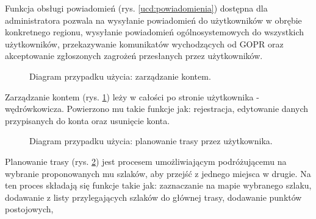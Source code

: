     Funkcja obsługi powiadomień (rys. \ref{ucd:powiadomienia}) dostępna dla administratora pozwala na wysyłanie powiadomień do użytkowników w obrębie konkretnego regionu, wysyłanie powiadomień ogólnosystemowych do wszystkich użytkowników, przekazywanie komunikatów wychodzących od GOPR oraz akceptowanie zgłoszonych zagrożeń przesłanych przez użytkowników.

    \setlength{\fboxrule}{0.5pt}
    \begin{figure}[H]
        \centering
        \caption{Diagram przypadku użycia: zarządzanie kontem.}
        \label{ucd:konto}
    \end{figure}
    Zarządzanie kontem (rys. \ref{ucd:konto}) leży w całości po stronie użytkownika - wędrówkowicza. Powierzono mu takie funkcje jak: rejestracja, edytowanie danych przypisanych do konta oraz usunięcie konta.

    \setlength{\fboxrule}{0.5pt}
    \begin{figure}[H]
        \centering
        \caption{Diagram przypadku użycia: planowanie trasy przez użytkownika.}
        \label{ucd:planowanie}
    \end{figure}
    Planowanie trasy (rys. \ref{ucd:planowanie}) jest procesem umożliwiającym podróżującemu na wybranie proponowanych mu szlaków, aby przejść z jednego miejsca w drugie. Na ten proces składają się funkcje takie jak: zaznaczanie na mapie wybranego szlaku, dodawanie z listy przylegających szlaków do głównej trasy, dodawanie punktów postojowych,

